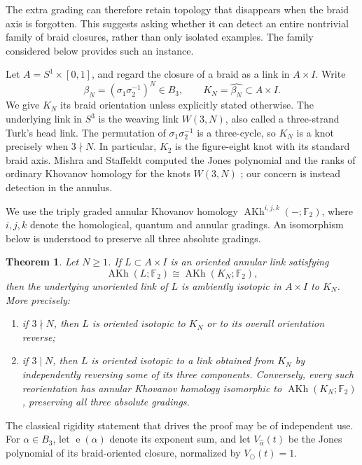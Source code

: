 \documentclass[10pt,a4paper]{amsart}
\newtheorem{theorem}{Theorem}[section]
\newcommand{\F}{\mathbb F_2}
\newcommand{\AKh}{\operatorname{AKh}}
\newcommand{\e}{\operatorname{e}}
\begin{document}
The extra grading can therefore retain topology that disappears when the braid axis is forgotten. This suggests asking whether it can detect an entire nontrivial family of braid closures, rather than only isolated examples. The family considered below provides such an instance.

Let \(A=S^1\times[0,1]\), and regard the closure of a braid as a link in
\(A\times I\).  Write
\[
  \beta_N=(\sigma_1\sigma_2^{-1})^N\in B_3,
  \qquad K_N=\widehat{\beta_N}\subset A\times I .
\]
We give \(K_N\) its braid orientation unless explicitly stated otherwise.
The underlying link in \(S^3\) is the weaving link \(W(3,N)\), also called a
three-strand Turk's head link.  The permutation of \(\sigma_1\sigma_2^{-1}\) is a
three-cycle, so \(K_N\) is a knot precisely when \(3\nmid N\).  In particular,
\(K_2\) is the figure-eight knot with its standard braid axis.  Mishra and Staffeldt
computed the Jones polynomial and the ranks of ordinary Khovanov homology for the
knots \(W(3,N)\) \cite{MishraStaffeldt}; our concern is instead detection in the
annulus.

We use the triply graded annular Khovanov homology
\(\AKh^{i,j,k}(-;\F)\), where \(i,j,k\) denote the homological, quantum and annular
gradings.  An isomorphism below is understood to preserve all three absolute gradings.


\begin{theorem}\label{thm:main}
Let \(N\geq 1\).  If \(L\subset A\times I\) is an oriented annular link satisfying
\[
  \AKh(L;\F)\cong \AKh(K_N;\F),
\]
then the underlying unoriented link of \(L\) is ambiently isotopic in \(A\times I\)
to \(K_N\).  More precisely:
\begin{enumerate}[label=\textup{(\roman*)}]
\item if \(3\nmid N\), then \(L\) is oriented isotopic to \(K_N\) or to its overall
orientation reverse;
\item if \(3\mid N\), then \(L\) is oriented isotopic to a link obtained from \(K_N\)
by independently reversing some of its three components.  Conversely, every such
reorientation has annular Khovanov homology isomorphic to \(\AKh(K_N;\F)\), preserving
all three absolute gradings.
\end{enumerate}
\end{theorem}


The classical rigidity statement that drives the proof may be of independent use.
For \(\alpha\in B_3\), let \(\e(\alpha)\) denote its exponent sum, and let
\(V_{\widehat\alpha}(t)\) be the Jones polynomial of its braid-oriented closure,
normalized by \(V_{\bigcirc}(t)=1\).
\end{document}

